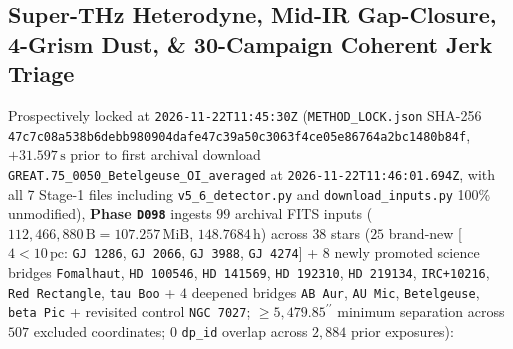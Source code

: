 \documentclass[twocolumn,10pt]{article}
\begin{document}
\subsection{Super-THz Heterodyne, Mid-IR Gap-Closure, 4-Grism Dust, \& 30-Campaign Coherent Jerk Triage}
Prospectively locked at \texttt{2026-11-22T11:45:30Z} (\texttt{METHOD\_LOCK.json} SHA-256 \texttt{47c7c08a\allowbreak 538b6deb\allowbreak b980904d\allowbreak afe47c39\allowbreak a50c3063\allowbreak f4ce05e8\allowbreak 6764a2bc\allowbreak 1480b84f}, $+31.597\,\text{s}$ prior to first archival download \texttt{GREAT.75\_0050\_Betelgeuse\_OI\_averaged} at \texttt{2026-11-22T11:46:01.694Z}, with all 7 Stage-1 files including \texttt{v5\_6\_detector.py} and \texttt{download\_inputs.py} 100\% unmodified), \textbf{Phase \texttt{D098}} ingests $99$ archival FITS inputs ($112{,}466{,}880\,\text{B} = 107.257\,\text{MiB}$, $148.7684\,\text{h}$) across $38$ stars ($25$ brand-new [$4 < 10\,\text{pc}$: \texttt{GJ\,1286}, \texttt{GJ\,2066}, \texttt{GJ\,3988}, \texttt{GJ\,4274}] + $8$ newly promoted science bridges \texttt{Fomalhaut}, \texttt{HD\,100546}, \texttt{HD\,141569}, \texttt{HD\,192310}, \texttt{HD\,219134}, \texttt{IRC+10216}, \texttt{Red\,Rectangle}, \texttt{tau\,Boo} + $4$ deepened bridges \texttt{AB\,Aur}, \texttt{AU\,Mic}, \texttt{Betelgeuse}, \texttt{beta\,Pic} + revisited control \texttt{NGC\,7027}; $\ge 5{,}479.85^{\prime\prime}$ minimum separation across $507$ excluded coordinates; $0$ \texttt{dp\_id} overlap across $2{,}884$ prior exposures):
\end{document}

